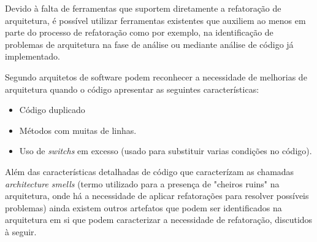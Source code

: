 Devido à falta de ferramentas que suportem diretamente a refatoração de arquitetura, é possível utilizar ferramentas existentes que auxiliem ao menos em parte do processo de refatoração como por exemplo, na identificação de problemas de arquitetura na fase de análise ou mediante análise de código já implementado.

Segundo \cite{babar2013agile} arquitetos de software podem reconhecer a necessidade de melhorias de arquitetura quando o código apresentar as seguintes características: 
    \begin{itemize}
        \item Código duplicado
        \item Métodos com muitas de linhas.
        \item Uso de \textit{switchs} em excesso (usado para substituir varias condições no código).
    \end{itemize}

Além das características detalhadas de código que caracterízam as chamadas \textit{architecture smells} (termo utilizado para a presença de "cheiros ruins" na arquitetura, onde há a necessidade de aplicar refatorações para resolver possíveis problemas) ainda existem outros artefatos que podem ser identificados na arquitetura em si que podem caracterizar a necessidade de refatoração, discutidos à seguir.

